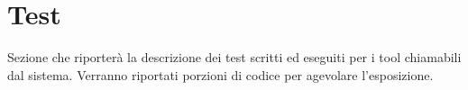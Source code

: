\section{Test}

Sezione che riporterà la descrizione dei test scritti ed eseguiti per i tool chiamabili dal sistema.
Verranno riportati porzioni di codice per agevolare l'esposizione.



